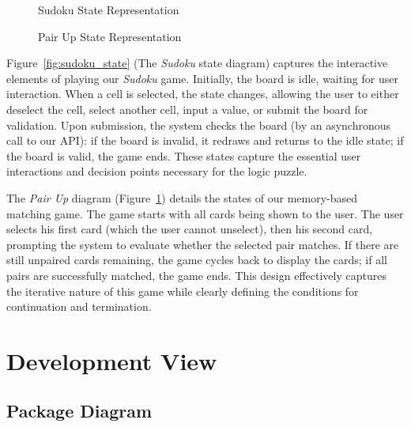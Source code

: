 \documentclass[11pt,a4paper]{article}
\newcommand{\inputdiagram}[1]{}
\newcommand{\textwidthdiagram}[2][1]{%
  \resizebox{#1\textwidth}{!}{\inputdiagram{#2}}%
}
\begin{document}
\begin{figure}[H]
    \centering
    \begin{minipage}[b]{0.48\textwidth}
        \centering
        \textwidthdiagram{sudoku_state.tex}
        \caption{Sudoku State Representation}
        \label{fig:sudoku_state}
    \end{minipage}
    \hfil
    \begin{minipage}[b]{0.48\textwidth}
        \centering
        \textwidthdiagram{pair_up_state.tex}
        \caption{Pair Up State Representation}
        \label{fig:pair_up_state}
    \end{minipage}
\end{figure}

Figure~\ref{fig:sudoku_state} (The \textit{Sudoku} state diagram) captures
the interactive elements of playing our \textit{Sudoku} game. Initially, the board
is idle, waiting for user interaction. When a cell is selected, the state
changes, allowing the user to either deselect the cell, select another
cell, input a value, or submit the board for validation. Upon submission,
the system checks the board (by an asynchronous call to our API): if the
board is invalid, it redraws and returns to the idle state; if the board
is valid, the game ends. These states capture the essential user interactions
and decision points necessary for the logic puzzle.

The \textit{Pair Up} diagram (Figure~\ref{fig:pair_up_state}) details the
states of our memory-based matching game. The game starts with all cards being
shown to the user. The user selects his first card (which the user cannot
unselect), then his second card, prompting the system to evaluate whether the
selected pair matches. If there are still unpaired cards remaining, the game cycles
back to display the cards; if all pairs are successfully matched,
the game ends. This design effectively captures the iterative nature of this
game while clearly defining the conditions for continuation and termination.








\section{Development View}

\subsection{Package Diagram}
\end{document}
